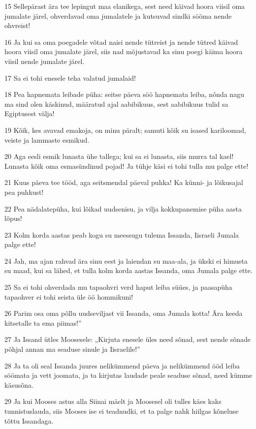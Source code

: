 \par 15 Sellepärast ära tee lepingut maa elanikega, sest need käivad hoora viisil oma jumalate järel, ohverdavad oma jumalatele ja kutsuvad sindki sööma nende ohvreist!
\par 16 Ja kui sa oma poegadele võtad naisi nende tütreist ja nende tütred käivad hoora viisil oma jumalate järel, siis nad mõjustavad ka sinu poegi käima hoora viisil nende jumalate järel.
\par 17 Sa ei tohi enesele teha valatud jumalaid!
\par 18 Pea hapnemata leibade püha: seitse päeva söö hapnemata leiba, nõnda nagu ma sind olen käskinud, määratud ajal aabibikuus, sest aabibikuus tulid sa Egiptusest välja!
\par 19 Kõik, kes avavad emakoja, on minu päralt; samuti kõik su isased kariloomad, veiste ja lammaste esmikud.
\par 20 Aga eesli esmik lunasta ühe tallega; kui sa ei lunasta, siis murra tal kael! Lunasta kõik oma esmasündinud pojad! Ja tühje käsi ei tohi tulla mu palge ette!
\par 21 Kuus päeva tee tööd, aga seitsmendal päeval puhka! Ka künni- ja lõikusajal pea puhkust!
\par 22 Pea nädalatepüha, kui lõikad uudsenisu, ja vilja kokkupanemise püha aasta lõpus!
\par 23 Kolm korda aastas peab kogu su meessugu tulema Issanda, Iisraeli Jumala palge ette!
\par 24 Jah, ma ajan rahvad ära sinu eest ja laiendan su maa-ala, ja ükski ei himusta su maad, kui sa lähed, et tulla kolm korda aastas Issanda, oma Jumala palge ette.
\par 25 Sa ei tohi ohverdada mu tapaohvri verd haput leiba süües, ja paasapüha tapaohver ei tohi seista üle öö hommikuni!
\par 26 Parim osa oma põllu uudseviljast vii Issanda, oma Jumala kotta! Ära keeda kitsetalle ta ema piimas!”
\par 27 Ja Issand ütles Moosesele: „Kirjuta enesele üles need sõnad, sest nende sõnade põhjal annan ma seaduse sinule ja Iisraelile!”
\par 28 Ja ta oli seal Issanda juures nelikümmend päeva ja nelikümmend ööd leiba söömata ja vett joomata, ja ta kirjutas laudade peale seaduse sõnad, need kümme käsusõna.
\par 29 Ja kui Mooses astus alla Siinai mäelt ja Moosesel oli tulles käes kaks tunnistuslauda, siis Mooses ise ei teadnudki, et ta palge nahk hiilgas kõneluse tõttu Issandaga.
